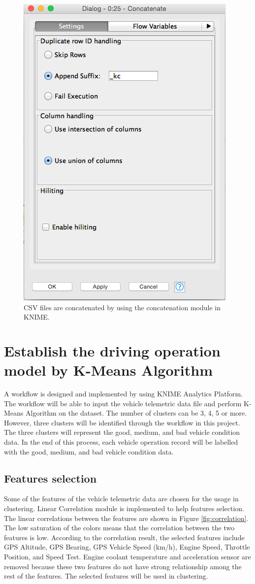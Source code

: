 \begin{figure}[hbt!]\centering
\includegraphics[height=.5\textwidth]{image/KNIMEconcatenate}
\caption{CSV files are concatenated by using the concatenation module in KNIME.}
\label{fig:KNIMEfile}
\end{figure}

\section{Establish the driving operation model by K-Means Algorithm}
A workflow is designed and implemented by using KNIME Analytics Platform. The workflow will be able to input the vehicle telemetric data file and perform K-Means Algorithm on the dataset. The number of clusters can be 3, 4, 5 or more. However, three clusters will be identified through the workflow in this project. The three clusters will represent the good, medium, and bad vehicle condition data. In the end of this process, each vehicle operation record will be labelled with the good, medium, and bad vehicle condition data.

\subsection{Features selection}
Some of the features of the vehicle telemetric data are chosen for the usage in clustering. Linear Correlation module is implemented to help features selection. The linear correlations between the features are shown in Figure \ref{fig:correlation}. The low saturation of the colors means that the correlation between the two features is low. According to the correlation result, the selected features include GPS Altitude, GPS Bearing, GPS Vehicle Speed (km/h), Engine Speed, Throttle Position, and Speed Test. Engine coolant temperature and acceleration sensor are removed because these two features do not have strong relationship among the rest of the features. The selected features will be used in clustering.

